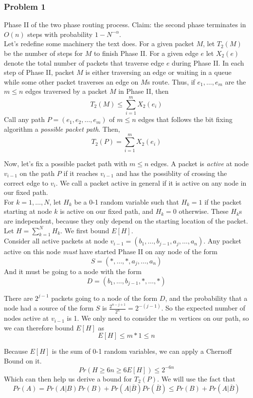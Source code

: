 \documentclass[12pt,letterpaper]{article}
\newenvironment{answer}[1]{
  \subsubsection*{Problem #1}
}{\newpage}
\begin{document}
\begin{answer}{1}
Phase II of the two phase routing process. Claim: the second phase terminates in $O(n)$ steps with probability $1 - N^{-\alpha}$. \\
Let's redefine some machinery the text does. For a given packet $M$, let $T_2(M)$ be the number of steps for $M$ to finish Phase II. For a given edge $e$ let $X_2(e)$ denote the total number of packets that traverse edge $e$ during Phase II. In each step of Phase II, packet $M$ is either traversing an edge or waiting in a queue while some other packet traverses an edge on $M$s route. Thus, if $e_1, \ldots, e_m$ are the $m \le n$ edges traversed by a packet $M$ in Phase II, then
	$$T_2(M) \le \sum_{i=1}^m X_2(e_i)$$
Call any path $P = (e_1,e_2,\ldots, e_m)$ of $m\le n$ edges that follows the bit fixing algorithm a \emph{possible packet path}. Then,
	$$T_2(P) = \sum_{i=1}^m X_2(e_i)$$

Now, let's fix a possible packet path with $m \le n$ edges. A packet is \emph{active} at node $v_{i-1}$ on the path $P$ if it reaches $v_{i-1}$ and has the possiblity of crossing the correct edge to $v_i$. We call a packet active in general if it is active on any node in our fixed path. \\

For $k = 1, \ldots, N$, let $H_k$ be a 0-1 random variable such that $H_k = 1$ if the packet starting at node $k$ is active on our fixed path, and $H_k = 0$ otherwise. These $H_k$s are independent, because they only depend on the starting location of the packet. Let $H = \sum_{k=1}^N H_k$. We first bound $E[H]$.\\

Consider all active packets at node $v_{i-1} = (b_1, \ldots, b_{j-1}, a_j, \ldots,  a_n)$. Any packet active on this node \emph{must} have started Phase II on any node of the form
	$$ S = (*, \ldots, *, a_j, \ldots, a_n) $$
And it must be going to a node with the form
	$$ D = (b_1, \ldots, b_{j-1}, *, \ldots, *)$$

There are $2^{j-1}$ packets going to a node of the form $D$, and the probability that a node had a source of the form $S$ is $\frac{2^{n-j + 1}}{2^n} = 2^{-(j-1)}$. So the expected number of nodes active at $v_{i-1}$ is 1. We only need to consider the $m$ vertices on our path, so we can therefore bound $E[H]$ as
	$$ E[H] \le  m * 1 \le n $$

Because $E[H]$ is the sum of 0-1 random variables, we can apply a Chernoff Bound on it.
	$$ Pr(H \ge 6n \ge 6E[H]) \le 2^{-6n}$$
Which can then help us derive a bound for $T_2(P)$. We will use the fact that
	$$Pr(A) = Pr(A | B)Pr(B) + Pr(A | \overline{B})Pr(\overline{B}) \le Pr(B) + Pr(A | \overline{B})$$


\end{answer}
\end{document}
